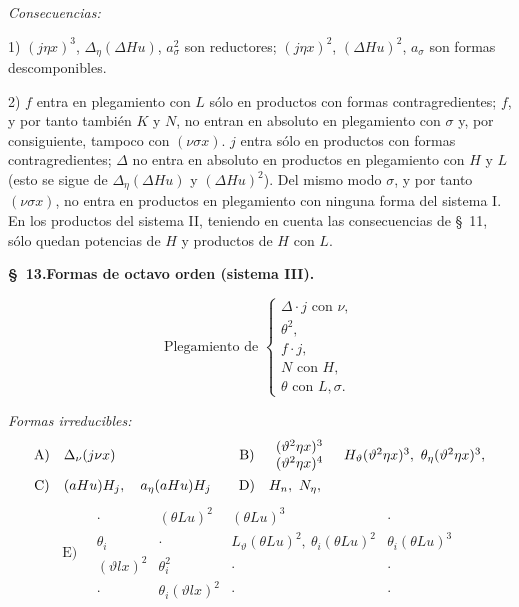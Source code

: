 \documentclass[11pt]{article}
\newcommand{\A}{\Delta}
\begin{document}
\noindent\emph{Consecuencias:}

1) $(j\eta x)^3$, $\A_\eta(\A Hu)$, $a_\sigma^2$ son reductores; $(j\eta x)^2$, $(\A Hu)^2$, $a_\sigma$ son formas descomponibles.

2) $f$ entra en plegamiento con $L$ sólo en productos con formas contragredientes; $f$, y por tanto también $K$ y $N$, no entran en absoluto en plegamiento con $\sigma$ y, por consiguiente, tampoco con $(\nu\sigma x)$. $j$ entra sólo en productos con formas contragredientes; $\A$ no entra en absoluto en productos en plegamiento con $H$ y $L$ (esto se sigue de $\A_\eta(\A Hu)$ y $(\A Hu)^2$). Del mismo modo $\sigma$, y por tanto $(\nu\sigma x)$, no entra en productos en plegamiento con ninguna forma del sistema I. En los productos del sistema II, teniendo en cuenta las consecuencias de \S\ 11, sólo quedan potencias de $H$ y productos de $H$ con $L$.

\begin{center}
\textbf{\S\ 13.\quad Formas de octavo orden (sistema III).}
\end{center}
\[
\text{Plegamiento de }\left\{\begin{array}{l}
\A\cdot j\text{ con }\nu,\\
\theta^2,\\
 f\cdot j,\\
 N\text{ con }H,\\
\theta\text{ con }L,\sigma.
\end{array}\right.
\]

\noindent\emph{Formas irreducibles:}
\[
\begin{array}{c@{\quad}l@{\qquad}c@{\quad}l}
\text{A)}&\A_\nu(j\nu x)&
\text{B)}&\begin{array}{c}(\vartheta^2\eta x)^3\\(\vartheta^2\eta x)^4\end{array}
\quad H_\vartheta(\vartheta^2\eta x)^3,
\ \theta_\eta(\vartheta^2\eta x)^3,\\[1em]
\text{C)}&(aHu)H_j,
\quad a_\eta(aHu)H_j&
\text{D)}&H_n,
\ N_\eta,
\end{array}
\]
\[
\text{E)}\quad
\begin{array}{c|c|c|c}
\cdot&(\theta Lu)^2&(\theta Lu)^3&\cdot\\
\theta_i&\cdot&L_\vartheta(\theta Lu)^2,
\ \theta_i(\theta Lu)^2&\theta_i(\theta Lu)^3\\
(\vartheta lx)^2&\theta_i^2&\cdot&\cdot\\
\cdot&\theta_i(\vartheta lx)^2&\cdot&\cdot
\end{array}
\]
\end{document}
